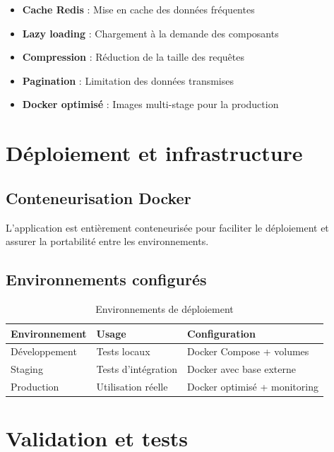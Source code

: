 \documentclass[12pt, a4paper]{report}
\begin{document}
\begin{itemize}
    \item \textbf{Cache Redis} : Mise en cache des données fréquentes
    \item \textbf{Lazy loading} : Chargement à la demande des composants
    \item \textbf{Compression} : Réduction de la taille des requêtes
    \item \textbf{Pagination} : Limitation des données transmises
    \item \textbf{Docker optimisé} : Images multi-stage pour la production
\end{itemize}

\section{Déploiement et infrastructure}

\subsection{Conteneurisation Docker}

L'application est entièrement conteneurisée pour faciliter le déploiement et assurer la portabilité entre les environnements.

\subsection{Environnements configurés}

\begin{table}[H]
\centering
\caption{Environnements de déploiement}
\begin{tabular}{|l|l|l|}
\hline
\textbf{Environnement} & \textbf{Usage} & \textbf{Configuration} \\
\hline
Développement & Tests locaux & Docker Compose + volumes \\
\hline
Staging & Tests d'intégration & Docker avec base externe \\
\hline
Production & Utilisation réelle & Docker optimisé + monitoring \\
\hline
\end{tabular}
\end{table}

\section{Validation et tests}
\end{document}
